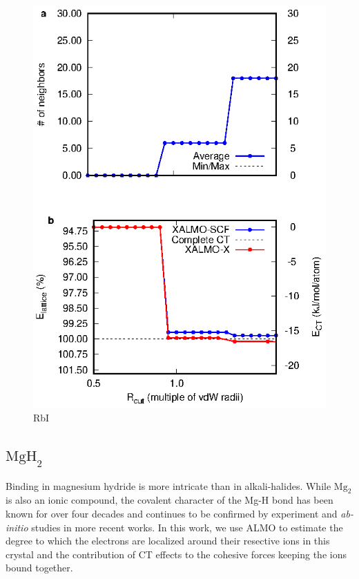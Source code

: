 \documentclass[aps,prb,twocolumn,amsmath,amssymb,superscriptaddress,longbibliography]{revtex4-1}
\begin{document}
\begin{figure}
\includegraphics[scale=1]{./plots/RbI_EvR}
\caption{RbI}
\label{rbi}
\end{figure}






\subsection*{ $\text{MgH}_{2}$ }

Binding in magnesium hydride is more intricate than in alkali-halides. While $\text{Mg}_{2}$ is also an ionic compound, the covalent character of the Mg-H bond has been known for over four decades and continues to be confirmed by experiment and \emph{ab-initio} studies in more recent works.
In this work, we use ALMO to estimate the degree to which the electrons are localized around their resective ions in this crystal and the contribution of CT effects to the cohesive forces keeping the ions bound together.    
\end{document}
